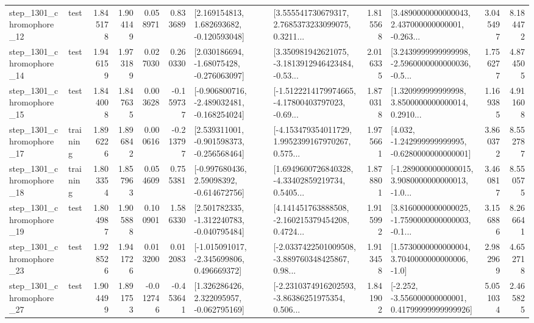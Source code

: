 \begin{tabular}{llrrrrllrlrr}
 step\_1301\_chromophore\_12 &      test &      1.845178 &    1.904149 &      0.058971 &  0.833689 &    [2.169154813, 1.682693682, -0.120593048] &  [3.555541730679317, 2.7685373233099075, 0.3211... &       1.815568 &  [3.4890000000000043, 2.437000000000001, -0.263... &            3.045497 &          8.184472 \\
 step\_1301\_chromophore\_14 &      test &      1.946159 &    1.973189 &      0.027030 &  0.260330 &    [2.030186694, -1.68075428, -0.276063097] &  [3.350981942621075, -3.1813912946423484, -0.53... &       2.016335 &  [3.2439999999999998, -2.5960000000000036, -0.5... &            1.756277 &          4.874505 \\
 step\_1301\_chromophore\_15 &      test &      1.844008 &    1.847635 &      0.003628 & -0.159737 &  [-0.906800716, -2.489032481, -0.168254024] &  [-1.5122214179974665, -4.17800403797023, -0.69... &       1.870318 &  [1.320999999999998, 3.8500000000000014, 0.2910... &            1.169385 &          4.911608 \\
 step\_1301\_chromophore\_17 &  training &      1.896226 &    1.896842 &      0.000616 & -0.213797 &   [2.539311001, -0.901598373, -0.256568464] &  [-4.153479354011729, 1.9952399167970267, 0.575... &       1.975661 &   [4.032, -1.242999999999995, -0.6280000000000001] &            3.860372 &          8.552787 \\
 step\_1301\_chromophore\_18 &  training &      1.803354 &    1.857963 &      0.054609 &  0.755381 &    [-0.997680436, 2.59098392, -0.614672756] &  [1.6949600726840328, -4.33402859219734, 0.5405... &       1.878801 &  [-1.2890000000000015, 3.9080000000000013, -1.0... &            3.460817 &          8.550575 \\
 step\_1301\_chromophore\_19 &      test &      1.804987 &    1.905888 &      0.100901 &  1.586330 &   [2.501782335, -1.312240783, -0.040795484] &  [4.141451763888508, -2.160215379454208, 0.4724... &       1.915992 &  [3.8160000000000025, -1.7590000000000003, -0.1... &            3.156886 &          8.266641 \\
 step\_1301\_chromophore\_23 &      test &      1.928526 &    1.941726 &      0.013200 &  0.012083 &   [-1.015091017, -2.345699806, 0.496669372] &  [-2.0337422501009508, -3.889760348425867, 0.98... &       1.913458 &     [1.5730000000000004, 3.7040000000000006, -1.0] &            2.982969 &          4.652718 \\
 step\_1301\_chromophore\_27 &      test &      1.904499 &    1.891753 &     -0.012746 & -0.453641 &    [1.326286426, 2.322095957, -0.062795169] &  [-2.2310374916202593, -3.86386251975354, 0.506... &       1.841902 &  [-2.252, -3.556000000000001, 0.41799999999999926] &            5.051034 &          2.465825 \\

\end{tabular}
